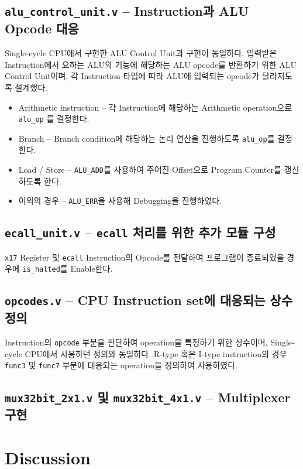\documentclass{scrartcl}
\begin{document}
\subsection{\texttt{alu\_control\_unit.v} -- Instruction과 ALU Opcode 대응}
Single-cycle CPU에서 구현한 ALU Control Unit과 구현이 동일하다. 입력받은 Instruction에서 요하는
ALU의 기능에 해당하는 ALU opcode를 반환하기 위한 ALU Control Unit이며, 각 Instruction 타입에 따라
ALU에 입력되는 opcode가 달라지도록 설계했다.
\begin{itemize}
  \item Arithmetic instruction -- 각 Instruction에 해당하는 Arithmetic operation으로 \texttt{alu\_op} 를 결정한다.
  \item Branch -- Branch condition에 해당하는 논리 연산을 진행하도록 \texttt{alu\_op}를 결정한다.
  \item Load / Store -- \texttt{ALU\_ADD}를 사용하여 주어진 Offset으로 Program Counter를 갱신하도록 한다.
  \item 이외의 경우 -- \texttt{ALU\_ERR}을 사용해 Debugging을 진행하였다.
\end{itemize}

\subsection{\texttt{ecall\_unit.v} -- \texttt{ecall} 처리를 위한 추가 모듈 구성}
\texttt{x17} Register 및 \texttt{ecall} Instruction의 Opcode를 전달하여 프로그램이 종료되었을 경우에
\texttt{is\_halted}를 Enable한다.

\subsection{\texttt{opcodes.v} -- CPU Instruction set에 대응되는 상수 정의}
Instruction의 \texttt{opcode} 부분을 판단하여 operation을 특정하기 위한 상수이며, Single-cycle CPU에서 사용하던 정의와 동일하다.
R-type 혹은 I-type instruction의 경우 \texttt{func3} 및 \texttt{func7} 부분에 대응되는 operation을 정의하여 사용하였다.

\subsection{\texttt{mux32bit\_2x1.v} 및 \texttt{mux32bit\_4x1.v} -- Multiplexer 구현}

\section{Discussion}
\end{document}
